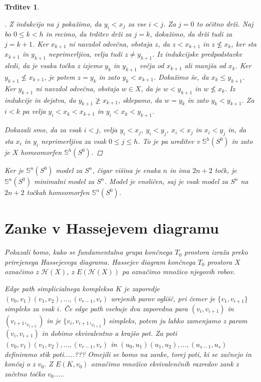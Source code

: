 \documentclass[a4paper,12pt]{article}
\DeclareRobustCommand{\h}{
    \mathcal{H}
}
\theoremstyle{definition}
\theoremstyle{plain}
\newtheorem{izrek}{Izrek}
\theoremstyle{definition}
\theoremstyle{plain}
\newtheorem{trditev}{Trditev}
\theoremstyle{plain}
\theoremstyle{plain}
\theoremstyle{plain}
\newenvironment{dokaz}{\begin{proof}[\bfseries\upshape\proofname]}{\end{proof}}
\begin{document}
\begin{trditev}
\begin{dokaz}
        Z indukcijo na $j$ pokažimo, da $y_i < x_j$ za vse $i<j$. Za $j=0$ to 
        očitno drži. Naj bo $0\leq k <h$ in recimo, da trditev drži za $j=k$, 
        dokažimo, da drži tudi za $j=k+1$. Ker $x_{k+1}$ ni navzdol odvečna, 
        obstaja $z$, da $z< x_{k+1}$ in $z\nleq x_k$, ker sta $x_{k+1}$ in 
        $y_{k+1}$ neprimerljiva, velja tudi $z\neq y_{k+1}$. Iz indukcijske 
        predpodstavke sledi, da je vsaka točka z izjemo $y_k$ in $y_{k+1}$ večja 
        od $x_{k+1}$ ali manjša od $x_k$. Ker $y_{k+1} \nleq x_{k+1}$, je potem
        $z=y_k$ in zato $y_k<x_{k+1}$. Dokažimo še, da $x_k\leq y_{k+1}$. Ker 
        $y_{k+1}$ ni navzdol odvečna, obstaja $w\in X$, da je $w<y_{k+1}$ in 
        $w\nleq x_k$. Iz indukcije in dejstva, da $y_{k+1}\ngeq x_{k+1}$, sklepamo,
        da $w=y_k$ in zato $y_k<y_{k+1}$. Za $i<k$ pa velja $y_i<x_k<x_{k+1}$ in
        $y_i<x_k<y_{k+1}$.

        Dokazali smo, da za vsak $i<j$,  velja $y_i < x_j,\ y_i < y_j,\ x_i < x_j$ in
        $x_i < y_j$ in, da sta $x_i$ in $y_i$ neprimerljiva za vsak $0\leq j \leq h$.
        To je pa ureditev v $\mathds{S}^h(S^0)$ in zato je $X$ homeomorfen 
        $\mathds{S}^h(S^0)$.

\end{dokaz}



Ker je $\mathds{S}^n(S^0)$ model za $S^n$, čigar višina je enaka $n$ in ima 
$2n+2$ točk, je $\mathds{S}^n(S^0)$ minimalni model za $S^n$. Model je 
enoličen, saj je vsak model za $S^n$ na $2n+2$ točkah homeomorfen 
$\mathds{S}^n(S^0)$.


\section{Zanke v Hassejevem diagramu}

Pokazali bomo, kako se fundamentalna grupa končnega $T_0$ 
prostora izraža preko prirejenega Hassejevega diagrama.
Hassejev diagram končnega $T_0$ prostora $X$ označimo z 
$\h(X)$, z $E(\h(X))$ pa označimo množico njegovih robov.

\textit{Edge path} simplicialnega kompleksa $K$ je zaporedje
$(v_0,v_1)(v_1,v_2),...,(v_{r-1},v_{r})$ urejenih parov 
oglišč, pri čemer je $\{v_1,v_{i+1}\}$ simpleks za vsak $i$. 
Če \textit{edge path} vsebuje dva zaporedna para 
$(v_i,v_{i+1})$ in $(v_{i+1},_v_{i+2})$ in je 
$\{v_i,v_{i+1},_v_{i+2}\}$ simpleks, potem ju lahko 
zamenjamo z parom $(v_i,v_{i+1})$ in dobimo ekvivalentno a 
krajšo pot. Za poti $(v_0,v_1)(v_1,v_2),...,(v_{r-1},v_{r})$ 
in $(u_0,u_1)(u_1,u_2),...,(u_{s-1},u_{s})$ definiramo stik 
poti.....???
Omejili se bomo na zanke, torej poti, ki se začnejo in končaj
o z $v_0$. Z $E(K,v_0)$ označimo množico ekvivalenčnih razredov
 zank z začetno točko $v_0$.....



\end{trditev}
\end{document}
